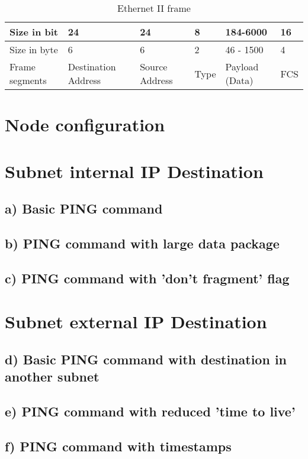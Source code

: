 \begin{table}[]
	\centering
	\label{ethernet}
	\begin{tabular}{|l|l|l|l|l|l|}
		\hline
		Size in bit    & 24                  & 24             & 8    & 184-6000       & 16             \\ \hline
		Size in byte   & 6                   & 6              & 2    & 46 - 1500      & 4              \\ \hline
		Frame segments & Destination Address & Source Address & Type & Payload (Data) & FCS \\ \hline
	\end{tabular}
	\caption{Ethernet II frame}
\end{table}

\section{Node configuration}

\section{Subnet internal IP Destination}
\subsection{a) Basic PING command}
\subsection{b) PING command with large data package}
\subsection{c) PING command with 'don't fragment' flag}

\section{Subnet external IP Destination}
\subsection{d) Basic PING command with destination in another subnet}
\subsection{e) PING command with reduced 'time to live'}
\subsection{f) PING command with timestamps}

